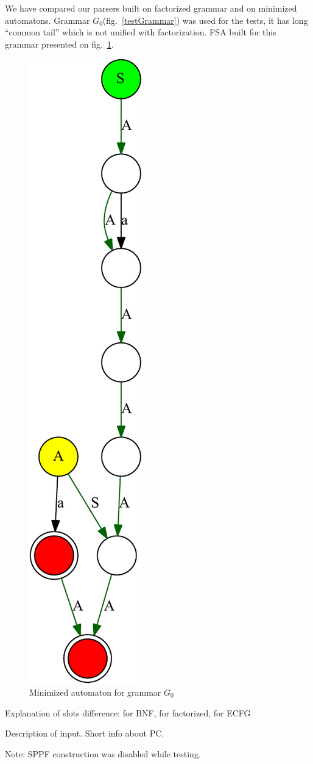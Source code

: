 \documentclass[runningheads,a4paper]{llncs}
\begin{document}
We have compared our parsers built on factorized grammar and on minimized automatons.
Grammar $G_0$(fig.~\ref{testGrammar}) was used for the tests,
it has long ``common tail'' which is not unified with factorization.
FSA built for this grammar presented on fig.~\ref{dfa}.

\begin{figure}
\centering
\includegraphics[height=0.95\textwidth,angle=90]{pictures/minimizedDFA.pdf}
\caption{\label{dfa}Minimized automaton for grammar $G_0$}
\end{figure}

Explanation of slots difference: for BNF, for factorized, for ECFG

Description of input. 
Short info about PC.

Note: SPPF construction was disabled while testing.
\end{document}
